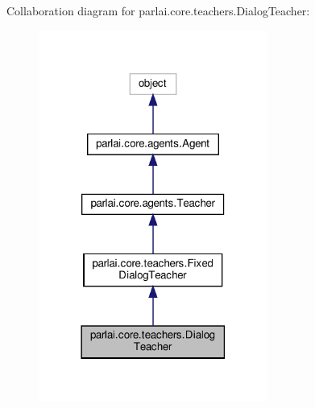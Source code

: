 Collaboration diagram for parlai.\+core.\+teachers.\+Dialog\+Teacher\+:
\nopagebreak
\begin{figure}[H]
\begin{center}
\leavevmode
\includegraphics[width=213pt]{classparlai_1_1core_1_1teachers_1_1DialogTeacher__coll__graph}
\end{center}
\end{figure}
